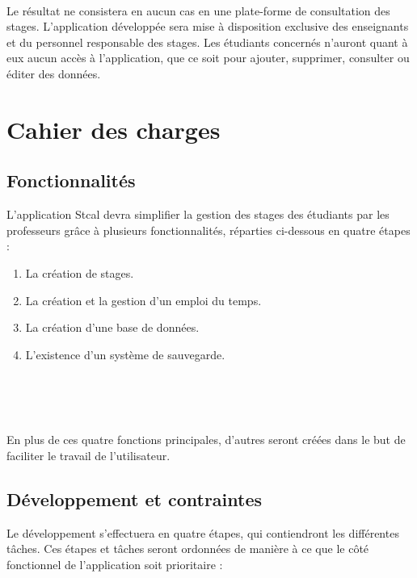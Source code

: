 \documentclass[a4paper,10pt]{report}
\begin{document}
  \paragraph{}
    Le résultat ne consistera en aucun cas en une plate-forme de consultation des stages.
    L'application développée sera mise à disposition exclusive des enseignants et du personnel responsable des stages. 
    Les étudiants concernés n'auront quant à eux aucun accès à l'application, que ce soit pour ajouter, supprimer, consulter ou éditer des données.
    
    
    
\part{Cahier des charges}
  
  \chapter{Fonctionnalités}

    L'application Stcal devra simplifier la gestion des stages des étudiants par les professeurs grâce à plusieurs fonctionnalités, réparties ci-dessous en quatre étapes  :

    \begin{enumerate}
      \item La création de stages.
      \item La création et la gestion d’un emploi du temps.
      \item La création d'une base de données. 
      \item L'existence d'un système de sauvegarde.
    \end{enumerate}
  ~\\~\\
    \paragraph{}
      En plus de ces quatre fonctions principales, d'autres seront créées dans le but de faciliter le travail de l'utilisateur. 
  

  \chapter{Développement et contraintes}

    Le développement s'effectuera en quatre étapes, qui contiendront les différentes tâches. Ces étapes et tâches seront ordonnées de manière à ce que le côté fonctionnel de l'application soit prioritaire :
\end{document}
